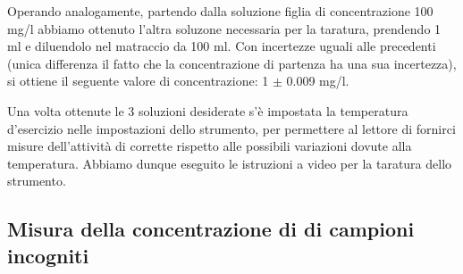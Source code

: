 Operando analogamente, partendo dalla soluzione figlia di concentrazione 100 mg/l abbiamo ottenuto l'altra soluzone
necessaria per la taratura, prendendo 1 ml e diluendolo nel matraccio da 100 ml. Con incertezze uguali alle precedenti (unica differenza il fatto che la concentrazione di partenza ha una sua incertezza), si ottiene il seguente
valore di concentrazione: 1 $\pm$ 0.009 mg/l.

Una volta ottenute le 3 soluzioni desiderate s'è impostata la temperatura d'esercizio nelle impostazioni
dello strumento, per permettere al lettore di fornirci misure dell'attività di 
corrette rispetto alle possibili variazioni dovute alla temperatura. Abbiamo dunque eseguito le istruzioni a video
per la taratura dello strumento.

\subsection*{Misura della concentrazione di  di campioni incogniti}
